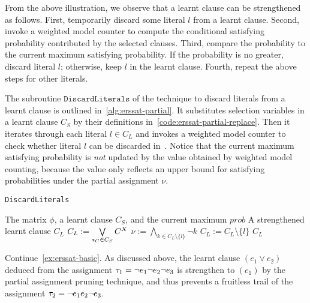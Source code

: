 From the above illustration,
we observe that a learnt clause can be strengthened as follows.
First, temporarily discard some literal $l$ from a learnt clause.
Second, invoke a weighted model counter to compute the conditional satisfying probability contributed by the selected clauses.
Third, compare the probability to the current maximum satisfying probability.
If the probability is no greater, discard literal $l$;
otherwise, keep $l$ in the learnt clause.
Fourth, repeat the above steps for other literals.

The subroutine $\texttt{DiscardLiterals}$ of the technique to discard literals from a learnt clause is outlined in~\cref{alg:erssat-partial}.
It substitutes selection variables in a learnt clause $C_S$ by their definitions in~\cref{code:erssat-partial-replace}.
Then it iterates through each literal $l \in C_L$ and invokes a weighted model counter to check whether literal $l$ can be discarded in~.
Notice that the current maximum satisfying probability is \textit{not} updated by the value obtained by weighted model counting,
because the value only reflects an upper bound for satisfying probabilities under the partial assignment $\nu$.

\begin{algorithm}[p]
    \caption{\texttt{DiscardLiterals}}
    \label{alg:erssat-partial}
    \begin{algorithmic}[1]
        \REQUIRE The matrix $\phi$, a learnt clause $C_S$, and the current maximum $prob$
        \ENSURE A strengthened learnt clause $C_L$
        \STATE $C_L := \bigvee\limits_{s_{C}\in C_S}C^X$\label{code:erssat-partial-replace}
        \label{code:erssat-partial-drop-start}
        \STATE $\nu := \bigwedge\limits_{k\in C_L\setminus\{l\}}\lnot k$
        \STATE $C_L := C_L \setminus \{l\}$\label{code:erssat-partial-drop-end}
        \ENDIF
        \ENDFOR
        \RETURN $C_L$
    \end{algorithmic}
\end{algorithm}

\begin{example}
    \label{ex:erssat-partial}
    Continue~\cref{ex:erssat-basic}.
    As discussed above, the learnt clause $(e_1 \lor e_2)$ deduced from the assignment $\tau_1=\lnot e_1 \lnot e_2 \lnot e_3$ is strengthen to $(e_1)$ by the partial assignment pruning technique,
    and thus prevents a fruitless trail of the assignment $\tau_2=\lnot e_1 e_2 \lnot e_3$.
\end{example}

